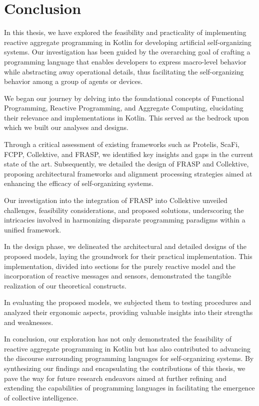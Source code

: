 
\chapter{Conclusion}
\label{chap:conclusion}

In this thesis, we have explored the feasibility and practicality of implementing reactive aggregate programming in Kotlin for developing artificial self-organizing systems. Our investigation has been guided by the overarching goal of crafting a programming language that enables developers to express macro-level behavior while abstracting away operational details, thus facilitating the self-organizing behavior among a group of agents or devices.

We began our journey by delving into the foundational concepts of Functional Programming, Reactive Programming, and Aggregate Computing, elucidating their relevance and implementations in Kotlin. This served as the bedrock upon which we built our analyses and designs.

Through a critical assessment of existing frameworks such as Protelis, ScaFi, FCPP, Collektive, and FRASP, we identified key insights and gaps in the current state of the art. Subsequently, we detailed the design of FRASP and Collektive, proposing architectural frameworks and alignment processing strategies aimed at enhancing the efficacy of self-organizing systems.

Our investigation into the integration of FRASP into Collektive unveiled challenges, feasibility considerations, and proposed solutions, underscoring the intricacies involved in harmonizing disparate programming paradigms within a unified framework.

In the design phase, we delineated the architectural and detailed designs of the proposed models, laying the groundwork for their practical implementation. This implementation, divided into sections for the purely reactive model and the incorporation of reactive messages and sensors, demonstrated the tangible realization of our theoretical constructs.

In evaluating the proposed models, we subjected them to testing procedures and analyzed their ergonomic aspects, providing valuable insights into their strengths and weaknesses.

In conclusion, our exploration has not only demonstrated the feasibility of reactive aggregate programming in Kotlin but has also contributed to advancing the discourse surrounding programming languages for self-organizing systems. By synthesizing our findings and encapsulating the contributions of this thesis, we pave the way for future research endeavors aimed at further refining and extending the capabilities of programming languages in facilitating the emergence of collective intelligence.
